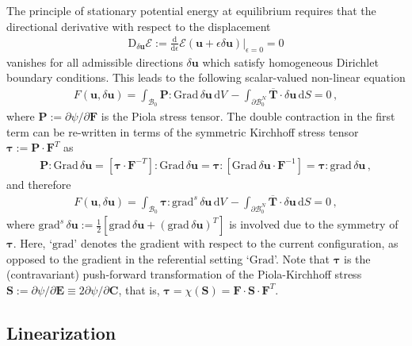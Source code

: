 \documentclass[AMA,STIX1COL]{WileyNJD-v2}
\newcommand*{\gz}[1]{\boldsymbol{#1}}
\newcommand*{\Grad}{\mathrm{Grad}}
\newcommand*{\grad}{\mathrm{grad}}
\renewcommand*{\d}{\mathrm{d}}
\newcommand*{\D}{\mathrm{D}}
\newcommand*{\mcl}[1]{\mathcal{#1}}
\begin{document}
The principle of stationary potential energy at equilibrium requires that the directional derivative with respect to the displacement
\begin{align}
\D_{\displaystyle \delta \gz u} \mcl E :=
\frac{\d}{\d \epsilon} \mcl E (\gz u + \epsilon \delta \gz u) \Bigr\rvert_{\epsilon=0}  = 0
\label{eq:stationary}
\end{align}
vanishes for all {\color{red}admissible} directions $\delta \gz u$ which satisfy homogeneous Dirichlet boundary conditions.
%
This leads to the following scalar-valued non-linear equation
\begin{align}
F(\gz u, \delta \gz u) =
\int_{\mcl B_0} \gz P : \Grad \, \delta \gz u \, \d V \,
-
\int_{\partial \mcl B_0^N} \overline{\gz T} \cdot \delta \gz u \, \d S
= 0 \, ,
\end{align}
where $\gz P := \partial \psi / \partial \gz F$ is the Piola stress tensor.
The double contraction in the first term can be re-written in terms of the symmetric Kirchhoff stress tensor $\gz \tau := \gz P \cdot \gz F^T$ as
\begin{align}
\gz P : \Grad \, \delta \gz u =
\left[\gz \tau \cdot \gz F^{-T}\right] : \Grad \, \delta \gz u =
\gz \tau : \left[\Grad \, \delta \gz u \cdot \gz F^{-1}\right] =
\gz \tau : \grad \, \delta \gz u \, ,
\end{align}
and therefore
\begin{align}
  F(\gz u, \delta \gz u) =
  \int_{\mcl B_0} \gz \tau : \grad^{s} \, \delta \gz u \, \d V \,
  -
  \int_{\partial \mcl B_0^N} \overline{\gz T} \cdot \delta \gz u \, \d S
  = 0 \, ,
\label{eq:weak_form}
\end{align}
where $\grad^{s} \, \delta \gz u := \frac{1}{2}\left[ \grad \, \delta \gz u + ( \grad \, \delta \gz u)^T\right]$
is involved due to the symmetry of $\gz \tau$.
Here, `$\grad$' denotes the gradient with respect to the current configuration, as opposed to the gradient in the referential setting `$\Grad$'.
Note that $\gz \tau$ is the (contravariant) push-forward transformation of the Piola-Kirchhoff stress $\gz S := \partial \psi / \partial \gz E \equiv 2 \partial \psi / \partial \gz C$,
that is, $\gz \tau = \chi(\gz S) = \gz F \cdot \gz S \cdot \gz F^T$.

\subsection{Linearization}
\end{document}
